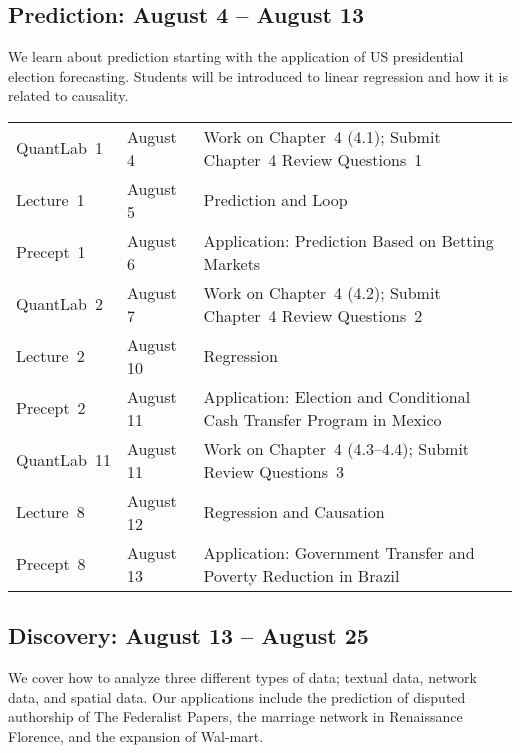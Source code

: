 \documentclass[11pt,letterpaper]{article}
\begin{document}
\bigskip 
\subsection*{Prediction: August 4 -- August 13}

We learn about prediction starting with the application of US
presidential election forecasting.  Students will be introduced to
linear regression and how it is related to causality.

\begin{center}
  \begin{tabular}{lll}
    \hline
    QuantLab~1 & August 4 & Work on Chapter~4 (4.1); Submit Chapter~4 Review Questions~1 \\
    Lecture~1  & August 5 & Prediction and Loop \\
    Precept~1  & August 6 & Application: Prediction Based on Betting Markets\\
    QuantLab~2 & August 7 & Work on Chapter~4 (4.2); Submit Chapter~4 Review Questions~2 \\
    Lecture~2  & August 10 & Regression \\
    Precept~2  & August 11 & Application: Election and Conditional Cash Transfer Program in Mexico
    \\
    QuantLab~11 & August 11 & Work on Chapter~4 (4.3--4.4); Submit Review Questions~3 \\
    Lecture~8  & August 12 & Regression and Causation \\
    Precept~8  & August 13 & Application: Government Transfer and Poverty Reduction in Brazil \\		
    \hline
  \end{tabular}
\end{center}

\bigskip 
\subsection*{Discovery: August 13 -- August 25}

We cover how to analyze three different types of data; textual data,
network data, and spatial data.  Our applications include the
prediction of disputed authorship of The Federalist Papers, the
marriage network in Renaissance Florence, and the expansion of
Wal-mart.
\end{document}
